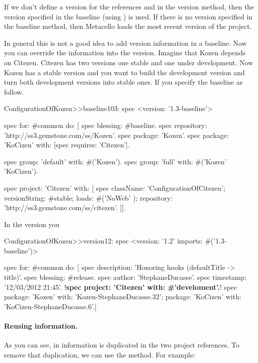 \documentclass[a4paper,10pt,twoside]{book}
\begin{document}
If we don't define a version for the references   and  in the version method, then the version specified in the baseline (using ) is used.  If there is no version specified in the baseline method, then Metacello loads the most recent version of the project.


In general this is not a good idea to add version information in a baseline. Now you can override the information into the version. Imagine that Kozen depends on Citezen. Citezen has two versions one stable and one under development. Now Kozen has a stable version and you want to build the development 
version and turn both development versions into stable ones. If you specify the baseline as follow.

\begin{code}{}
ConfigurationOfKozen>>baseline103: spec
	<version: '1.3-baseline'>
 	
 	spec for: #common do: [
 		spec blessing: #baseline.
 		spec repository: 'http://ss3.gemstone.com/ss/Kozen'.
 		spec package: 'Kozen'.
 		spec package: 'KoCizen' with: [spec requires: 'Citezen'].
 				
 		spec group: 'default' with: #('Kozen').
 		spec group: 'full' with: #('Kozen' 'KoCizen').
 		
 	spec project: 'Citezen' with: [
 			spec className: 'ConfigurationOfCitezen';
 			versionString: #stable;
 			loads: #('NoWeb' );
 			repository: 'http://ss3.gemstone.com/ss/citezen'.	]].
\end{code}

In the version you 
\begin{code}{}
ConfigurationOfKozen>>version12: spec
       <version: '1.2' imports: #('1.3-baseline')>

       spec for: #common do: [
               spec description: 'Honoring hooks (defaultTitle -> title)'.
               spec blessing: #release.
               spec author: 'StephaneDucasse'.
               spec timestamp: '12/03/2012 21:45'.
			!\textbf{spec project: 'Citezen' with: \#'develoment'.}!
               spec 
                       package: 'Kozen' with: 'Kozen-StephaneDucasse.32';
                       package: 'KoCizen' with: 'KoCizen-StephaneDucasse.6'.]
\end{code}



\paragraph{Reusing information.}
As you can see, in  information is duplicated in the two project references. To remove that duplication, we can use the  method.  For example:
\end{document}
